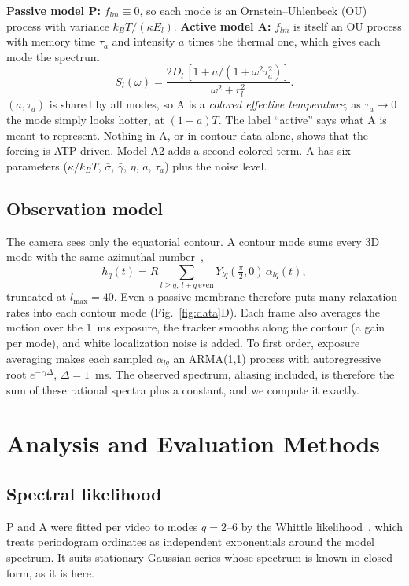 \documentclass[conference]{IEEEtran}
\begin{document}
\textbf{Passive model P:} $f_{lm} \equiv 0$, so each mode is an Ornstein--Uhlenbeck (OU) process
with variance $k_BT/(\kappa E_l)$. \textbf{Active model A:} $f_{lm}$ is itself an OU process with
memory time $\tau_a$ and intensity $a$ times the thermal one, which gives each mode the spectrum
\begin{equation}
S_l(\omega) = \frac{2D_l\,[1 + a/(1+\omega^2\tau_a^2)]}{\omega^2 + r_l^2}.
\label{eq:spectrum}
\end{equation}
$(a,\tau_a)$ is shared by all modes, so A is a \emph{colored effective temperature}; as
$\tau_a \to 0$ the mode simply looks hotter, at $(1+a)T$. The label ``active'' says what A is meant
to represent. Nothing in A, or in contour data alone, shows that the forcing is ATP-driven. Model
A2 adds a second colored term. A has six parameters ($\kappa/k_BT$, $\bar\sigma$, $\bar\gamma$,
$\eta$, $a$, $\tau_a$) plus the noise level.

\subsection{Observation model}
The camera sees only the equatorial contour. A contour mode sums every 3D mode with the same
azimuthal number~\cite{milner1987,faizi2020},
\begin{equation}
h_q(t) = R\sum_{l\ge q,\ l+q\ \mathrm{even}} Y_{lq}(\tfrac\pi2,0)\,\alpha_{lq}(t),
\label{eq:proj}
\end{equation}
truncated at $l_{\max} = 40$. Even a passive membrane therefore puts many relaxation rates into
each contour mode (Fig.~\ref{fig:data}D). Each frame also averages the motion over the 1~ms
exposure, the tracker smooths along the contour (a gain per mode), and white localization noise is
added. To first order, exposure averaging makes each sampled $\alpha_{lq}$ an ARMA(1,1) process
with autoregressive root $e^{-r_l\Delta}$, $\Delta = 1$~ms. The observed spectrum, aliasing
included, is therefore the sum of these rational spectra plus a constant, and we compute it exactly.

\section{Analysis and Evaluation Methods}\label{sec:analysis}

\subsection{Spectral likelihood}
P and A were fitted per video to modes $q = 2$--6 by the Whittle likelihood~\cite{whittle1953},
which treats periodogram ordinates as independent exponentials around the model spectrum. It suits
stationary Gaussian series whose spectrum is known in closed form, as it is here.
\end{document}
